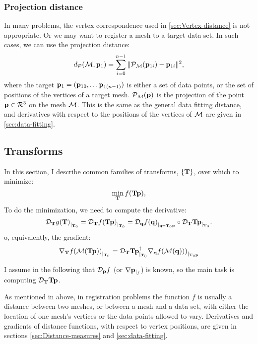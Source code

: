 \subsubsection{Projection distance}
\label{sec:Projection-distance}

In many problems, the vertex correspondence used in
\autoref{sec:Vertex-distance} is not appropriate.
Or we may want to register a mesh to a target data set.
In such cases, we can use the projection distance:
\begin{equation}
d_{{\mathcal P}}({\mathcal M},{\mathbf p}_1) = \sum_{i=0}^{n-1} \| {\mathcal P}_{{\mathcal M}}({\mathbf p}_{1i}) - {\mathbf p}_{1i} \|^2,
\end{equation}
where the target ${\mathbf p}_1 = ({\mathbf p}_{10}, \ldots {\mathbf p}_{1(n-1)})$
is either a set of data points,
or the set of positions of the vertices of a target mesh.
${\mathcal P}_{{\mathcal M}}({\mathbf p})$ is the projection of the point ${\mathbf p} \in \mathcal{R}^3$
on the mesh ${\mathcal M}$.
This is the same as the general data fitting distance, and
derivatives with respect to the positions of the vertices
of ${\mathcal M}$ are given in \autoref{sec:data-fitting}.

\subsection{Transforms}
\label{sec:Transforms}

In this section, I describe common families
of transforms, $\{{\mathbf T}\}$, over which to minimize:
\begin{equation}
\min_{{\mathbf T}} f( {\mathbf T} {\mathbf p}),
\end{equation}
To do the minimization, we need to compute
the derivative:
\begin{equation}
{\mathcal D}_{{\mathbf T}}{g({\mathbf T})}_{\mid_{{\mathbf T}_0}}
= {\mathcal D}_{{\mathbf T}}{f({\mathbf T}{\mathbf p})}_{\mid_{{\mathbf T}_0}}
= {\mathcal D}_{{\mathbf q}}{f({\mathbf q})}_{\mid_{{\mathbf q}={\mathbf T}_0{\mathbf p}}}
\circ
{\mathcal D}_{{\mathbf T}}{{\mathbf T}{\mathbf p}}_{\mid_{{\mathbf T}_0}}.
\end{equation}
o, equivalently, the gradient:
\begin{equation}
{\mathbf \nabla}_{{\mathbf T}}{{f( {\mathcal M}({\mathbf T}{\mathbf p}) )}}_{\mid_{{\mathbf T}_0}}
 =
{\mathcal D}_{{\mathbf T}}{{\mathbf T}{\mathbf p}}_{\mid_{{\mathbf T}_0}}^\dagger
{\mathbf \nabla}_{{\mathbf q}}{{f({\mathcal M}({\mathbf q})))}}_{\mid_{{\mathbf T}_0{\mathbf p}}}
\end{equation}

I assume in the following
that ${\mathcal D}_{{\mathbf p}}{f}$ (or ${\mathbf \nabla}{{\mathbf p}}_{\mid_{f}}$) is known,
so the main task is computing ${\mathcal D}_{{\mathbf T}}{{\mathbf T}{\mathbf p}}$.

As mentioned in above,
in registration problems
the function $f$ is usually a distance between
two meshes, or between a mesh and a data set,
with either the location of one mesh's vertices
or the data points allowed to vary.
Derivatives and gradients of distance functions,
with respect to vertex positions,
are given in sections \ref{sec:Distance-measures}
and \ref{sec:data-fitting}.

